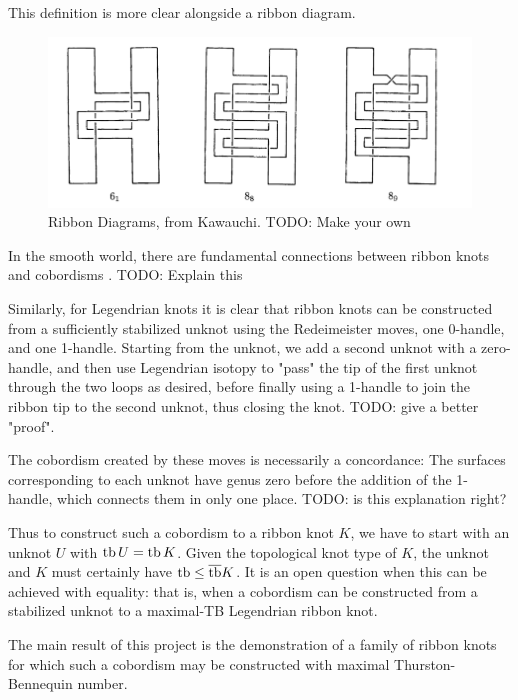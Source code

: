 This definition is more clear alongside a ribbon diagram.

\begin{figure}[ht!]
    \centering
    \includegraphics[width=0.8\linewidth]{images/ribbon-knots-kawauchi.png}
    \caption{Ribbon Diagrams, from Kawauchi. TODO: Make your own}%
    \label{fig:ribbon-knots-kawauchi}
\end{figure}

In the smooth world, there are fundamental connections between ribbon knots and cobordisms \cite{fox-milnor}. TODO: Explain this

Similarly, for Legendrian knots it is clear that ribbon knots can be constructed from a sufficiently stabilized unknot using the Redeimeister moves, one 0-handle, and one 1-handle. 
Starting from the unknot, we add a second unknot with a zero-handle, and then use Legendrian isotopy to "pass" the tip of the first unknot through the two loops as desired, before finally using a 1-handle to join the ribbon tip to the second unknot, thus closing the knot. 
TODO: give a better "proof".

The cobordism created by these moves is necessarily a concordance: The surfaces corresponding to each unknot have genus zero before the addition of the 1-handle, which connects them in only one place.
TODO: is this explanation right?

Thus to construct such a cobordism to a ribbon knot $K$, we have to start with an unknot $U$ with $\operatorname{tb} U = \operatorname{tb} K$. Given the topological knot type of $K$, the unknot and $K$ must certainly have $\operatorname{tb} \leq \overline{\operatorname{tb}} K$.
It is an open question when this can be achieved with equality: that is, when a cobordism can be constructed from a stabilized unknot to a maximal-TB Legendrian ribbon knot. 

The main result of this project is the demonstration of a family of ribbon knots for which such a cobordism may be constructed with maximal Thurston-Bennequin number.

